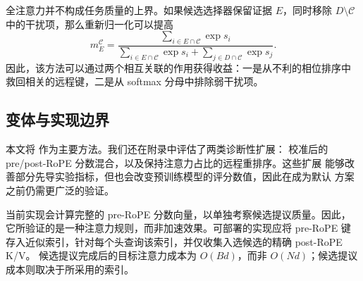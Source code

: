 全注意力并不构成任务质量的上界。如果候选选择器保留证据 $E$，同时移除
$D\setminus\mathcal C$ 中的干扰项，那么重新归一化可以提高
\begin{equation}
  m_E^{\mathcal C}
  =\frac{\sum_{i\in E\cap\mathcal C}\exp s_i}
  {\sum_{i\in E\cap\mathcal C}\exp s_i+
   \sum_{j\in D\cap\mathcal C}\exp s_j}.
  \label{eq:sparse-mass}
\end{equation}
因此，该方法可以通过两个相互关联的作用获得收益：一是从不利的相位排序中
救回相关的远程键，二是从 softmax 分母中排除弱干扰项。

\subsection{变体与实现边界}

本文将 \methodpost 作为主要方法。我们还在附录中评估了两类诊断性扩展：
校准后的 pre/post-RoPE 分数混合，以及保持注意力占比的远程重排序。这些扩展
能够改善部分先导实验指标，但也会改变预训练模型的评分数值，因此在成为默认
方案之前仍需更广泛的验证。

当前实现会计算完整的 pre-RoPE 分数向量，以单独考察候选提议质量。因此，
它所验证的是一种注意力规则，而非加速效果。可部署的实现应将 pre-RoPE 键
存入近似索引，针对每个头查询该索引，并仅收集入选候选的精确 post-RoPE
K/V。 候选提议完成后的目标注意力成本为 $O(Bd)$，而非
$O(Nd)$；候选提议成本则取决于所采用的索引。

